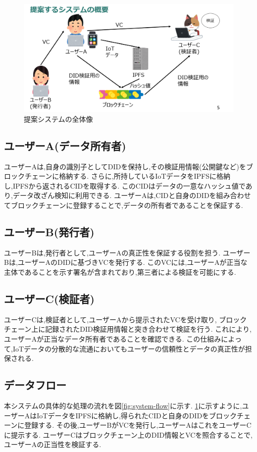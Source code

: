 \documentclass[a4paper,9pt,twocolumn]{ltjsarticle} %
\begin{document}
\begin{figure}[H]
  \centering
  \includegraphics[width=0.9\linewidth]{figure1.png}
  \caption{提案システムの全体像}
  \label{fig:system-overview}
\end{figure}

\subsection{ユーザーA(データ所有者)}
ユーザーAは,自身の識別子としてDIDを保持し,その検証用情報(公開鍵など)をブロックチェーンに格納する.
さらに,所持しているIoTデータをIPFSに格納し,IPFSから返されるCIDを取得する.
このCIDはデータの一意なハッシュ値であり,データ改ざん検知に利用できる.
ユーザーAは,CIDと自身のDIDを組み合わせてブロックチェーンに登録することで,データの所有者であることを保証する.

\subsection{ユーザーB(発行者)}
ユーザーBは,発行者として,ユーザーAの真正性を保証する役割を担う.
ユーザーBは,ユーザーAのDIDに基づきVCを発行する.
このVCには,ユーザーAが正当な主体であることを示す署名が含まれており,第三者による検証を可能にする.

\subsection{ユーザーC(検証者)}
ユーザーCは,検証者として,ユーザーAから提示されたVCを受け取り,
ブロックチェーン上に記録されたDID検証用情報と突き合わせて検証を行う.
これにより,ユーザーAが正当なデータ所有者であることを確認できる.
この仕組みによって,IoTデータの分散的な流通においてもユーザーの信頼性とデータの真正性が担保される.

\subsection{データフロー}
本システムの具体的な処理の流れを図\ref{fig:system-flow}に示す.
\ref{fig:system-overview}に示すように,ユーザーAはIoTデータをIPFSに格納し,得られたCIDと自身のDIDをブロックチェーンに登録する.
その後,ユーザーBがVCを発行し,ユーザーAはこれをユーザーCに提示する.
ユーザーCはブロックチェーン上のDID情報とVCを照合することで,ユーザーAの正当性を検証する.
\end{document}
